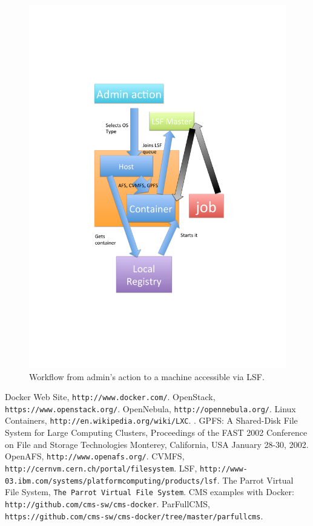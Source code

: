 \documentclass{PoS}
\begin{document}
\begin{figure}
\begin{center}
\includegraphics[width=.8\textwidth]{dockerpisa.pdf}
\caption{Workflow from admin's action to a machine accessible via LSF.}
\label{fig:dockerPisa}
\end{center}
\end{figure}
%


\begin{thebibliography}{99}
 Docker Web Site, \texttt{http://www.docker.com/}.
OpenStack, \texttt{https://www.openstack.org/}.
OpenNebula, \texttt{http://opennebula.org/}.
Linux Containers, \texttt{http://en.wikipedia.org/wiki/LXC}.
. GPFS: A Shared-Disk File System for Large Computing Clusters, Proceedings of the FAST 2002 Conference on File and Storage Technologies Monterey, California, USA January 28-30, 2002.
 OpenAFS, \texttt{http://www.openafs.org/}.
 CVMFS, \texttt{http://cernvm.cern.ch/portal/filesystem}.
 LSF, \texttt{http://www-03.ibm.com/systems/platformcomputing/products/lsf}.
The Parrot Virtual File System, \texttt{The Parrot Virtual File System}.
 CMS examples with Docker: \texttt{http://github.com/cms-sw/cms-docker}.
 ParFullCMS, \texttt{https://github.com/cms-sw/cms-docker/tree/master/parfullcms}.




\end{thebibliography}
\end{document}
